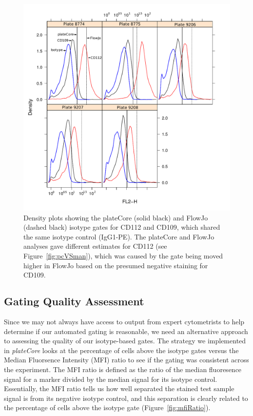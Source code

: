 \documentclass[12pt]{article}
\newcommand{\Rpackage}[1]{{\textit{#1}}}
\begin{document}
\begin{figure}
\centering
\includegraphics{fjVSr3.pdf}
\caption{Density plots showing the plateCore (solid black) and FlowJo (dashed
black) isotype gates for CD112  and CD109, which shared the same isotype control
(IgG1-PE). The plateCore and FlowJo analyses gave different estimates for CD112
(see Figure~\ref{fig:pcVSman}), which was caused by the gate being moved
higher in FlowJo based on the presumed negative staining for CD109.}
\label{fig:pcVSman2}
\end{figure}

\subsection*{Gating Quality Assessment}

Since we may not always have access to output from expert cytometrists to
help determine if our automated gating is reasonable, we need an alternative
approach to assessing the quality of our isotype-based gates. The strategy we
implemented in \Rpackage{plateCore} looks at the percentage of cells above the
isotype gates versus the Median Fluorsence Intensity (MFI) ratio to see if the
gating was consistent across the experiment. The
MFI ratio is defined as the ratio of the median fluoresence signal for a marker
divided by the median signal for its isotype control. Essentially, the MFI
ratio tells us how well separated the stained test sample signal is from its
negative isotype control, and this separation is clearly related to the
percentage of cells above the isotype gate (Figure~\ref{fig:mfiRatio}).
\end{document}
